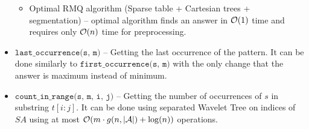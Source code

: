\begin{itemize}
\begin{itemize}
        \item Optimal RMQ algorithm \cite{RMQ1} (Sparse table + Cartesian trees + segmentation) -- optimal algorithm finds an answer in $\mathcal{O}(1)$ time and requires only $\mathcal{O}(n)$ time for preprocessing.
    \end{itemize}
    \item $\texttt{last\_occurrence(s, m)}$ -- Getting the last occurrence of the pattern. It can be done similarly to $\texttt{first\_occurrence(s, m)}$ with the only change that the answer is maximum instead of minimum.
    \item $\texttt{count\_in\_range(s, m, i, j)}$ -- Getting the number of occurrences of $s$ in substring $t[i:j]$. It can be done using separated Wavelet Tree on indices of $SA$ using at most $\mathcal{O}(m\cdot g(n, |\mathcal{A}|) + \log (n))$ operations.
\end{itemize}